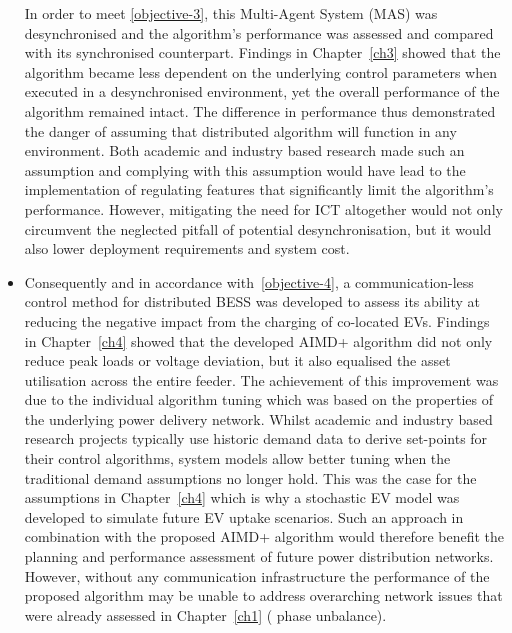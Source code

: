 \begin{itemize}
	In order to meet \ref{objective-3}, this Multi-Agent System (MAS) was desynchronised and the algorithm's performance was assessed and compared with its synchronised counterpart.
	Findings in Chapter~\ref{ch3} showed that the algorithm became less dependent on the underlying control parameters when executed in a desynchronised environment, yet the overall performance of the algorithm remained intact.
	The difference in performance thus demonstrated the danger of assuming that distributed algorithm will function in any environment.
	Both academic and industry based research made such an assumption and complying with this assumption would have lead to the implementation of regulating features that significantly limit the algorithm's performance.
	However, mitigating the need for ICT altogether would not only circumvent the neglected pitfall of  potential desynchronisation, but it would also lower deployment requirements and system cost.
	\item
	Consequently and in accordance with \ref{objective-4}, a communication-less control method for distributed BESS was developed to assess its ability at reducing the negative impact from the charging of co-located EVs.
	Findings in Chapter~\ref{ch4} showed that the developed AIMD+ algorithm did not only reduce peak loads or voltage deviation, but it also equalised the asset utilisation across the entire feeder.
	The achievement of this improvement was due to the individual algorithm tuning which was based on the properties of the underlying power delivery network.
	Whilst academic and industry based research projects typically use historic demand data to derive set-points for their control algorithms, system models allow better tuning when the traditional demand assumptions no longer hold.
	This was the case for the assumptions in Chapter~\ref{ch4} which is why a stochastic EV model was developed to simulate future EV uptake scenarios.
	Such an approach in combination with the proposed AIMD+ algorithm would therefore benefit the planning and performance assessment of future power distribution networks.
	However, without any communication infrastructure the performance of the proposed algorithm may be unable to address overarching network issues that were already assessed in Chapter~\ref{ch1} ( phase unbalance).
\end{itemize}







